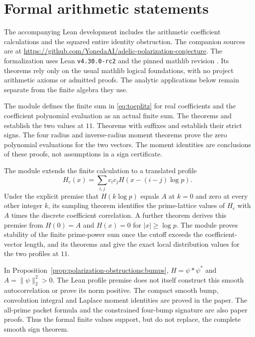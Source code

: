 \documentclass[11pt,letterpaper]{article}
\theoremstyle{definition}
\theoremstyle{remark}
\begin{document}
\section{Formal arithmetic statements}
\label{sec:formal}

The accompanying Lean development includes the arithmetic
coefficient calculations and the squared entire identity
obstruction. The companion sources are at
\url{https://github.com/YonedaAI/adelic-polarization-conjecture}.
The formalization uses Lean
\texttt{v4.30.0-rc2} and the pinned mathlib revision
.
Its theorems rely only on the usual mathlib logical
foundations, with no project arithmetic axioms or
admitted proofs. The analytic applications below remain
separate from the finite algebra they use.

The module  defines the
finite sum in \eqref{eq:toeplitz} for real coefficients
and the coefficient polynomial evaluation as an actual
finite sum. The theorems  and
 establish the two values at $11$.
Theorems with suffixes  and
 establish their strict signs.
The four radius and inverse-radius moment theorems prove
the zero polynomial evaluations for the two vectors.
The moment identities are conclusions of these proofs,
not assumptions in a sign certificate.

The module 
extends the finite calculation to a translated profile
\begin{equation}
 H_c(x)=\sum_{i,j}c_ic_jH(x-(i-j)\log p).
 \label{eq:formal-profile}
\end{equation}
Under the explicit premise that $H(k\log p)$ equals $A$
at $k=0$ and zero at every other integer $k$, its
sampling theorem identifies the prime-lattice values of
$H_c$ with $A$ times the discrete coefficient correlation.
A further theorem derives this premise from $H(0)=A$
and $H(x)=0$ for $|x|\geq\log p$. The module proves
stability of the finite prime-power sum once the cutoff
exceeds the coefficient-vector length, and its theorems
 and
 give the exact local
distribution values for the two profiles at $11$.

In Proposition~\ref{prop:polarization-obstructions:bumps},
$H=\psi*\psi^*$ and $A=\|\psi\|_2^2>0$. The Lean
profile premise does not itself construct this smooth
autocorrelation or prove its norm positive. The compact
smooth bump, convolution integral and Laplace moment
identities are proved in the paper. The all-prime packet
formula and the constrained four-bump signature are also
paper proofs. Thus the formal finite values support,
but do not replace, the complete smooth sign theorem.
\end{document}
